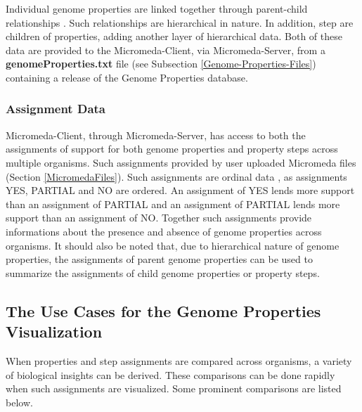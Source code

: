 Individual genome properties are linked together through parent-child relationships \cite{richardson2018genome}. Such relationships are hierarchical in nature. In addition, step are children of properties, adding another layer of hierarchical data. Both of these data are provided to the Micromeda-Client, via Micromeda-Server, from a \textbf{genomeProperties.txt} file (see Subsection \ref{Genome-Properties-Files}) containing a release of the Genome Properties database.

\subsubsection{Assignment Data}

Micromeda-Client, through Micromeda-Server, has access to both the assignments of support for both genome properties and property steps across multiple organisms. Such assignments provided by user uploaded Micromeda files (Section \ref{MicromedaFiles}). Such assignments are ordinal data \cite{richardson2018genome,agresti2010analysis}, as assignments YES, PARTIAL and NO are ordered. An assignment of YES lends more support than an assignment of PARTIAL and an assignment of PARTIAL lends more support than an assignment of NO. Together such assignments provide informations about the presence and absence of genome properties across organisms. It should also be noted that, due to hierarchical nature of genome properties, the assignments of parent genome properties can be used to summarize the assignments of child genome properties or property steps.

\subsection{The Use Cases for the Genome Properties Visualization}

When properties and step assignments are compared across organisms, a variety of biological insights can be derived. These comparisons can be done rapidly when such assignments are visualized. Some prominent comparisons are listed below.

